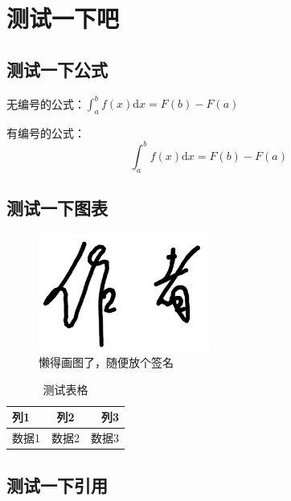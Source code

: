 
\section{测试一下吧}

\subsection{测试一下公式}

无编号的公式：$\int_a^b f(x)\mathrm{d}x=F(b)-F(a)$

有编号的公式：
\begin{equation}
    \int_a^b f(x)\mathrm{d}x=F(b)-F(a)
\end{equation}


\subsection{测试一下图表}

\begin{figure}[htbp]
    \centering
    \includegraphics[width=0.5\textwidth]{signatures/author.png}
    \caption{懒得画图了，随便放个签名}
    \label{fig:example}
\end{figure}

\begin{table}[htbp]
    \centering
    \caption{测试表格}
    \begin{tabularx}{0.8\linewidth}{|L|C|R|}
        \hline
        列1  & 列2  & 列3  \\
        \hline
        数据1 & 数据2 & 数据3 \\
        \hline
    \end{tabularx}
    \label{tab:example}
\end{table}

\subsection{测试一下引用}

